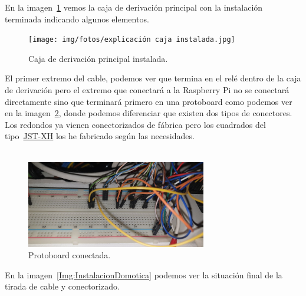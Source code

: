 En la imagen~\ref{Img:CajaDerivacionPrincipal} vemos la caja de derivación principal con la instalación terminada indicando algunos elementos.

\begin{figure}[h]
    \centering
    \texttt{[image: img/fotos/explicación caja instalada.jpg]}
    \caption{Caja de derivación principal instalada.} \label{Img:CajaDerivacionPrincipal}
\end{figure}

El primer extremo del cable, podemos ver que termina en el relé dentro de la caja de derivación pero el extremo que conectará a la Raspberry Pi no se conectará directamente sino que terminará primero en una protoboard como podemos ver en la imagen~\ref{Img:ProtoboardConecada}, donde podemos diferenciar que existen dos tipos de conectores. Los redondos ya vienen conectorizados de fábrica pero los cuadrados del tipo~\href{https://ae01.alicdn.com/kf/H4205e9c4ec4c4be4864e44b6925a22bdf/10-juegos-de-conector-de-Cable-de-2-54mm-XH2-54-conector-XH-macho-y-hembra.jpg_Q90.jpg_.webp}{JST-XH} los he fabricado según las necesidades.~\\~\\

\begin{figure}[h]
    \centering
    \includegraphics[width=0.7\textwidth]{img/fotos/protoboard-instalada.jpeg}
    \caption{Protoboard conectada.} \label{Img:ProtoboardConecada}
\end{figure}

En la imagen~\ref{Img:InstalacionDomotica} podemos ver la situación final de la tirada de cable y conectorizado.~\\~\\

